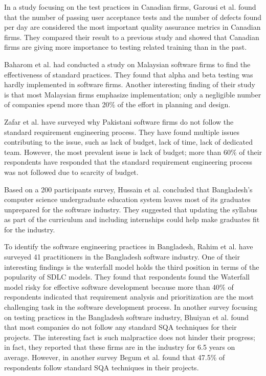 In a study focusing on the test practices in Canadian firms, Garousi et al.\cite{Garousi2013} found that the number of passing user acceptance tests and the number of defects found per day are considered the most important quality assurance metrics in Canadian firms. They compared their result to a previous study and showed that Canadian firms are giving more importance to testing related training than in the past.

Baharom et al.\cite{Baharom2006} had conducted a study on Malaysian software firms to find the effectiveness of standard practices. They found that alpha and beta testing was hardly implemented in software firms. Another interesting finding of their study is that most Malaysian firms emphasize implementation; only a  negligible number of companies spend more than 20\% of the effort in planning and design.

Zafar et al.\cite{Zafar2018} have surveyed why Pakistani software firms do not follow the standard requirement engineering process. They have found multiple issues contributing to the issue, such as lack of budget, lack of time, lack of dedicated team. However, the most prevalent issue is lack of budget; more than 60\% of their respondents have responded that the standard requirement engineering process was not followed due to scarcity of budget.

Based on a 200 participants survey, Hussain et al.\cite{Hussain2020} concluded that Bangladesh's computer science undergraduate education system leaves most of its graduates unprepared for the software industry. They suggested that updating the syllabus as part of the curriculum and including internships could help make graduates fit for the industry.

To identify the software engineering practices in Bangladesh, Rahim et al.\cite{Rahim2017} have surveyed 41 practitioners in the Bangladesh software industry. One of their interesting findings is the waterfall model holds the third position in terms of the popularity of SDLC models. They found that respondents found the Waterfall model risky for effective software development because more than 40\% of respondents indicated that requirement analysis and prioritization are the most challenging task in the software development process. In another survey focusing on testing practices in the Bangladesh software industry, Bhuiyan et al.\cite{M2018} found that most companies do not follow any standard SQA techniques for their projects. The interesting fact is such malpractice does not hinder their progress; in fact, they reported that these firms are in the industry for 6.5 years on average. However, in another survey Begum et al.\cite{Begum2009}  found that 47.5\% of respondents follow standard SQA techniques in their projects.